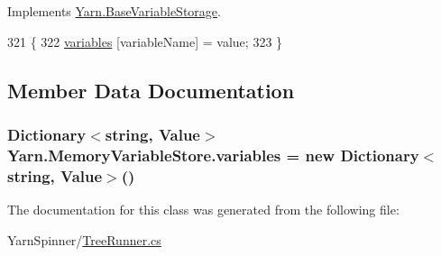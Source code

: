 Implements \hyperlink{a00021_a1c57d6d208b78abec0a670396771448e}{Yarn.\-Base\-Variable\-Storage}.


\begin{DoxyCode}
321         \{
322             \hyperlink{a00052_aad18acd95297edb8ed496857337f8071}{variables} [variableName] = value;
323         \}
\end{DoxyCode}


\subsection{Member Data Documentation}
\hypertarget{a00052_aad18acd95297edb8ed496857337f8071}{
\subsubsection[{variables}]{\setlength{\rightskip}{0pt plus 5cm}Dictionary$<$string, {\bf Value}$>$ Yarn.\-Memory\-Variable\-Store.\-variables = new Dictionary$<$string, {\bf Value}$>$()\hspace{0.3cm}{\ttfamily [private]}}}\label{a00052_aad18acd95297edb8ed496857337f8071}


The documentation for this class was generated from the following file\-:\begin{DoxyCompactItemize}
\item 
Yarn\-Spinner/\hyperlink{a00125}{Tree\-Runner.\-cs}\end{DoxyCompactItemize}
